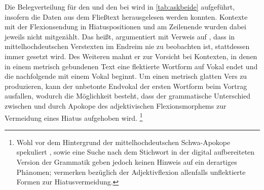 Die Belegverteilung für den  und den  bei
\citet{askedal1973} wird in \cref{tab:askbeide} aufgeführt, insofern die Daten
aus dem Fließtext herausgelesen werden konnten. Kontexte mit der Flexionsendung
in Hiatuspositionen und am Zeilenende wurden dabei jeweils nicht mitgezählt.
Das heißt, \citet[89--91]{askedal1973} argumentiert mit Verweis auf
\citet[662--663]{grimm1870}, dass in mittelhochdeutschen Verstexten im Endreim
nie  zu beobachten ist, stattdessen immer  gesetzt wird. Des
Weiteren mahnt er zur Vorsicht bei Kontexten, in denen in einem metrisch
gebundenen Text eine flektierte Wortform auf Vokal endet und die nachfolgende
mit einem Vokal beginnt. Um einen metrisch glatten Vers zu produzieren, kann
der unbetonte Endvokal der ersten Wortform beim Vortrag ausfallen, wodurch die
Möglichkeit besteht, dass der grammatische Unterschied zwischen  und
 durch Apokope des adjektivischen Flexionsmorphems zur Vermeidung
eines Hiatus aufgehoben wird.%
%
	\footnote{Wohl vor dem Hintergrund der mittelhochdeutschen Schwa-Apokope
		\autocites{lindgren1953}[109--111]{paul2007} spekuliert
		\citet[91]{askedal1973},  \citet[27, 109--111,
		203]{paul2007} sowie eine Suche nach dem Stichwort  in der
		digital aufbereiteten Version der Grammatik geben jedoch keinen Hinweis
		auf ein derartiges Phänomen; \citet[244]{ksw2} vermerken bezüglich der
		Adjektivflexion allenfalls unflektierte Formen zur Hiatusvermeidung.
		}
		
